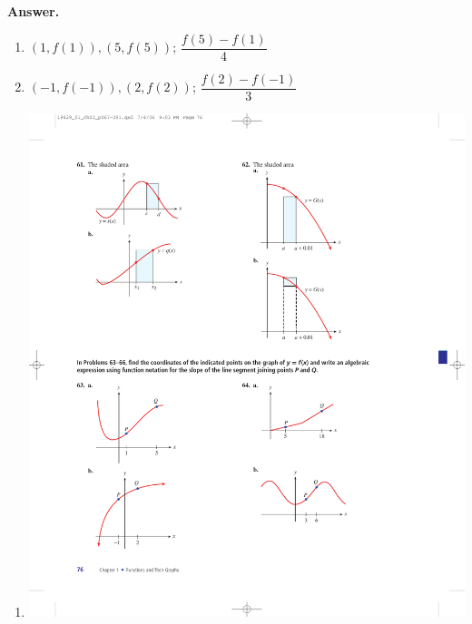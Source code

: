 \documentclass[10pt,]{book}
\theoremstyle{plain}
\theoremstyle{definition}
\theoremstyle{definition}
\theoremstyle{definition}
\theoremstyle{definition}
\numberwithin{equation}{part}
\begin{document}
\begin{exercisegroup}
\begin{multicols}{2}
\begin{enumerate}[label=*\alph**]
%
\end{enumerate}
\end{multicols}
%
\par\smallskip
\noindent\textbf{Answer.}\hypertarget{answer-157}{}\quad
\leavevmode%
\begin{multicols}{2}
\begin{enumerate}[label=*\alph**]
\item\hypertarget{li-1092}{}\((1, f (1)), (5, f (5))\); \(\dfrac{f (5) - f (1)}{4}\)%
\item\hypertarget{li-1093}{}\((-1, f (-1)), (2, f (2))\); \(\dfrac{f (2) - f (-1)}{3}\)%
\end{enumerate}
\end{multicols}
%
\exercise[64.]\hypertarget{exercise-279}{}\leavevmode%
\begin{multicols}{2}
\begin{enumerate}[label=*\alph**]
\item\hypertarget{li-1094}{}\includegraphics[width=0.8\linewidth]{images/fig-ex-1-4-64a}
%

\end{enumerate}
\end{multicols}
\end{exercisegroup}
\end{document}
